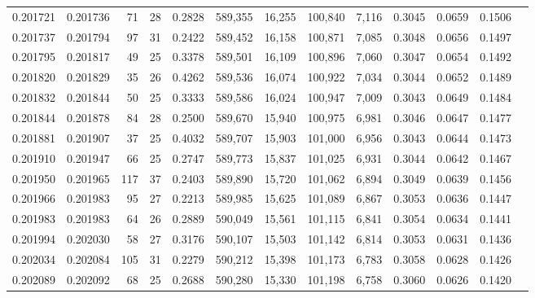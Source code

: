 \begin{tabular}{rrrrrrrrrrrrr}
0.201721 & 0.201736 &    71 &  28 &                                     0.2828 & 589,355 &  16,255 & 100,840 &   7,116 & 0.3045 & 0.0659 & 0.1506 \\
0.201737 & 0.201794 &    97 &  31 &                                     0.2422 & 589,452 &  16,158 & 100,871 &   7,085 & 0.3048 & 0.0656 & 0.1497 \\
0.201795 & 0.201817 &    49 &  25 &                                     0.3378 & 589,501 &  16,109 & 100,896 &   7,060 & 0.3047 & 0.0654 & 0.1492 \\
0.201820 & 0.201829 &    35 &  26 &                                     0.4262 & 589,536 &  16,074 & 100,922 &   7,034 & 0.3044 & 0.0652 & 0.1489 \\
0.201832 & 0.201844 &    50 &  25 &                                     0.3333 & 589,586 &  16,024 & 100,947 &   7,009 & 0.3043 & 0.0649 & 0.1484 \\
0.201844 & 0.201878 &    84 &  28 &                                     0.2500 & 589,670 &  15,940 & 100,975 &   6,981 & 0.3046 & 0.0647 & 0.1477 \\
0.201881 & 0.201907 &    37 &  25 &                                     0.4032 & 589,707 &  15,903 & 101,000 &   6,956 & 0.3043 & 0.0644 & 0.1473 \\
0.201910 & 0.201947 &    66 &  25 &                                     0.2747 & 589,773 &  15,837 & 101,025 &   6,931 & 0.3044 & 0.0642 & 0.1467 \\
0.201950 & 0.201965 &   117 &  37 &                                     0.2403 & 589,890 &  15,720 & 101,062 &   6,894 & 0.3049 & 0.0639 & 0.1456 \\
0.201966 & 0.201983 &    95 &  27 &                                     0.2213 & 589,985 &  15,625 & 101,089 &   6,867 & 0.3053 & 0.0636 & 0.1447 \\
0.201983 & 0.201983 &    64 &  26 &                                     0.2889 & 590,049 &  15,561 & 101,115 &   6,841 & 0.3054 & 0.0634 & 0.1441 \\
0.201994 & 0.202030 &    58 &  27 &                                     0.3176 & 590,107 &  15,503 & 101,142 &   6,814 & 0.3053 & 0.0631 & 0.1436 \\
0.202034 & 0.202084 &   105 &  31 &                                     0.2279 & 590,212 &  15,398 & 101,173 &   6,783 & 0.3058 & 0.0628 & 0.1426 \\
0.202089 & 0.202092 &    68 &  25 &                                     0.2688 & 590,280 &  15,330 & 101,198 &   6,758 & 0.3060 & 0.0626 & 0.1420 \\

\end{tabular}
